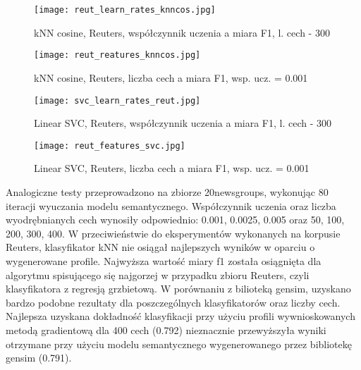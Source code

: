 \documentclass{pracamgr}
\begin{document}
\begin{figure}[]
  \texttt{[image: reut\_learn\_rates\_knncos.jpg]}
  \caption{kNN cosine, Reuters, współczynnik uczenia a miara F1, l. cech - 300}\label{fig:reut_learn_rates_knncos}
\endminipage\hfill
{}%
  \texttt{[image: reut\_reatures\_knncos.jpg]}
  \caption{kNN cosine, Reuters, liczba cech a miara F1, wsp. ucz. = 0.001}\label{fig:reut_features_knncos}
\endminipage\hfill
\end{figure}

\begin{figure}[]
  \texttt{[image: svc\_learn\_rates\_reut.jpg]}
  \caption{Linear SVC, Reuters, współczynnik uczenia a miara F1, l. cech - 300}\label{fig:svc_learn_rates_reut}
\endminipage\hfill
{}%
  \texttt{[image: reut\_features\_svc.jpg]}
  \caption{Linear SVC, Reuters, liczba cech a miara F1, wsp. ucz. = 0.001}\label{fig:reut_features_svc}
\endminipage\hfill
\end{figure}

Analogiczne testy przeprowadzono na zbiorze 20newsgroups, wykonując 80 iteracji wyuczania modelu semantycznego. Współczynnik uczenia oraz liczba wyodrębnianych cech wynosiły odpowiednio:  0.001, 0.0025, 0.005 oraz 50, 100, 200, 300, 400. W przeciwieństwie do eksperymentów wykonanych na korpusie Reuters, klasyfikator kNN nie osiągał najlepszych wyników w oparciu o wygenerowane profile. Najwyższa wartość miary f1 została osiągnięta dla algorytmu spisującego się najgorzej w przypadku zbioru Reuters, czyli klasyfikatora z regresją grzbietową. W porównaniu z bilioteką gensim, uzyskano bardzo podobne rezultaty dla poszczególnych klasyfikatorów oraz liczby cech. Najlepsza uzyskana dokładność klasyfikacji przy użyciu profili wywnioskowanych metodą gradientową dla 400 cech (0.792) nieznacznie przewyższyła wyniki otrzymane przy użyciu modelu semantycznego wygenerowanego przez bibliotekę gensim (0.791).
\end{document}
